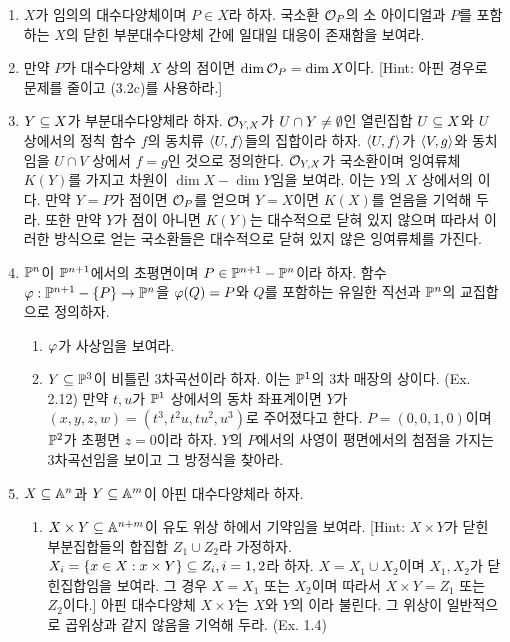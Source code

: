 \begin{enumerate}[label=\tb{3.\arabic*.},itemindent=0mm,itemsep=2mm]
	\item $X$가 임의의 대수다양체이며 $P\in X$라 하자.
	국소환 $\mathcal{O}_P$의 소 아이디얼과 $P$를 포함하는 $X$의 닫힌 부분대수다양체 간에 일대일 대응이 존재함을 보여라.
	\item 만약 $P$가 대수다양체 $X$ 상의 점이면 $\dim\mathcal{O}_P=\dim X$이다. [Hint: 아핀 경우로 문제를 줄이고 (3.2c)를 사용하라.]
	\item {} $Y\subseteq X$가 부분대수다양체라 하자.
	$\mathcal{O}_{Y,X}$가 $U\cap Y\ne\emptyset$인 열린집합 $U\subseteq X$와 $U$ 상에서의 정칙 함수 $f$의 동치류 $\Braket{U,f}$들의 집합이라 하자.
	$\Braket{U,f}$가 $\Braket{V,g}$와 동치임을 $U\cap V$ 상에서 $f=g$인 것으로 정의한다.
	$\mathcal{O}_{Y,X}$가 국소환이며 잉여류체 $K(Y)$를 가지고 차원이 $\dim X-\dim Y$임을 보여라.
	이는 $Y$의 $X$ 상에서의 이다.
	만약 $Y=P$가 점이면 $\mathcal{O}_P$를 얻으며 $Y=X$이면 $K(X)$를 얻음을 기억해 두라.
	또한 만약 $Y$가 점이 아니면 $K(Y)$는 대수적으로 닫혀 있지 않으며
	따라서 이러한 방식으로 얻는 국소환들은 대수적으로 닫혀 있지 않은 잉여류체를 가진다.
	\item {} $\mathbb{P}^n$이 $\mathbb{P}^{n+1}$에서의 초평면이며 $P\in\mathbb{P}^{n+1}-\mathbb{P}^n$이라 하자.
	함수 $\varphi:\mathbb{P}^{n+1}-\{P\}\rightarrow\mathbb{P}^n$을 $\varphi(Q)=P$와 $Q$를 포함하는 유일한 직선과 $\mathbb{P}^n$의 교집합으로 정의하자.
	\begin{enumerate}[label=(\alph*)]
	\item $\varphi$가 사상임을 보여라.
	\item $Y\subseteq\mathbb{P}^3$이 비틀린 3차곡선이라 하자. 이는 $\mathbb{P}^1$의 3차 매장의 상이다. (Ex. 2.12)
	만약 $t,u$가 $\mathbb{P}^1$ 상에서의 동차 좌표계이면 $Y$가 
	$(x,y,z,w)=(t^3,t^2u,tu^2,u^3)$로 주어졌다고 한다. $P=(0,0,1,0)$이며 $\mathbb{P}^2$가 초평면 $z=0$이라 하자.
	$Y$의 $P$에서의 사영이 평면에서의 첨점을 가지는 3차곡선임을 보이고 그 방정식을 찾아라.
	\end{enumerate}
	\item {} $X\subseteq\mathbb{A}^n$과 $Y\subseteq\mathbb{A}^m$이 아핀 대수다양체라 하자.
	\begin{enumerate}[label=(\alph*)]
	\item $X\times Y\subseteq\mathbb{A}^{n+m}$이 유도 위상 하에서 기약임을 보여라.
	[Hint: $X\times Y$가 닫힌 부분집합들의 합집합 $Z_1\cup Z_2$라 가정하자.
	$X_i=\{x\in X:x\times Y\}\subseteq Z_i,i=1,2$라 하자. $X=X_1\cup X_2$이며 $X_1,X_2$가 닫힌집합임을 보여라.
	그 경우 $X=X_1$ 또는 $X_2$이며 따라서 $X\times Y=Z_1$ 또는 $Z_2$이다.]
	아핀 대수다양체 $X\times Y$는 $X$와 $Y$의 이라 불린다.
	그 위상이 일반적으로 곱위상과 같지 않음을 기억해 두라. (Ex. 1.4)

\end{enumerate}
\end{enumerate}

